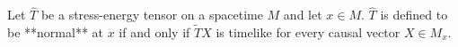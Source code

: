 Let $\hat{T}$ be a stress-energy tensor on a spacetime $M$ and let $x \in M$. $\hat{T}$ is defined to be **normal** at $x$ if and only if $\tilde{T}X$ is timelike for every causal vector $X \in M_x$.
